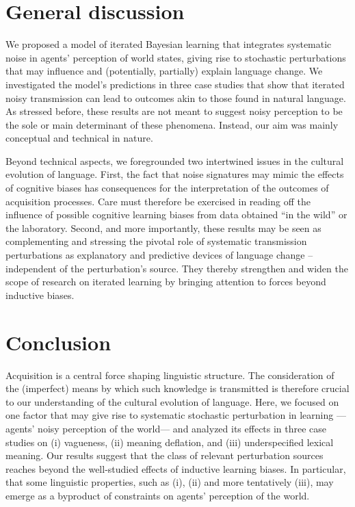 \documentclass[10pt,a4paper]{article}
\begin{document}
\section{General discussion}
We proposed a model of iterated Bayesian learning that integrates systematic noise in agents'
perception of world states, giving rise to stochastic perturbations that may influence and
(potentially, partially) explain language change. We investigated the model's predictions in
three case studies that show that iterated noisy transmission can lead to outcomes akin to
those found in natural language. As stressed before, these results are not meant to suggest
noisy perception to be the sole or main determinant of these phenomena. Instead, our aim was
mainly conceptual and technical in nature.

Beyond technical aspects, we foregrounded two intertwined issues in the cultural evolution of
language. First, the fact that noise signatures may mimic the effects of cognitive biases has
consequences for the interpretation of the outcomes of acquisition processes. Care must
therefore be exercised in reading off the influence of possible cognitive learning biases from
data obtained ``in the wild'' or the laboratory. Second, and more importantly, these results
may be seen as complementing and stressing the pivotal role of systematic transmission
perturbations as explanatory and predictive devices of language change -- independent of the
perturbation's source. They thereby strengthen and widen the scope of research on iterated
learning by bringing attention to forces beyond inductive biases.


\section{Conclusion}
Acquisition is a central force shaping linguistic structure. The consideration of the
(imperfect) means by which such knowledge is transmitted is therefore crucial to our
understanding of the cultural evolution of language. Here, we focused on one factor that may
give rise to systematic stochastic perturbation in learning ---agents' noisy perception of the
world--- and analyzed its effects in three case studies on (i) vagueness, (ii) meaning
deflation, and (iii) underspecified lexical meaning. Our results suggest that the class of
relevant perturbation sources reaches beyond the well-studied effects of inductive learning
biases. In particular, that some linguistic properties, such as (i), (ii) and more tentatively
(iii), may emerge as a byproduct of constraints on agents' perception of the world.
\end{document}
